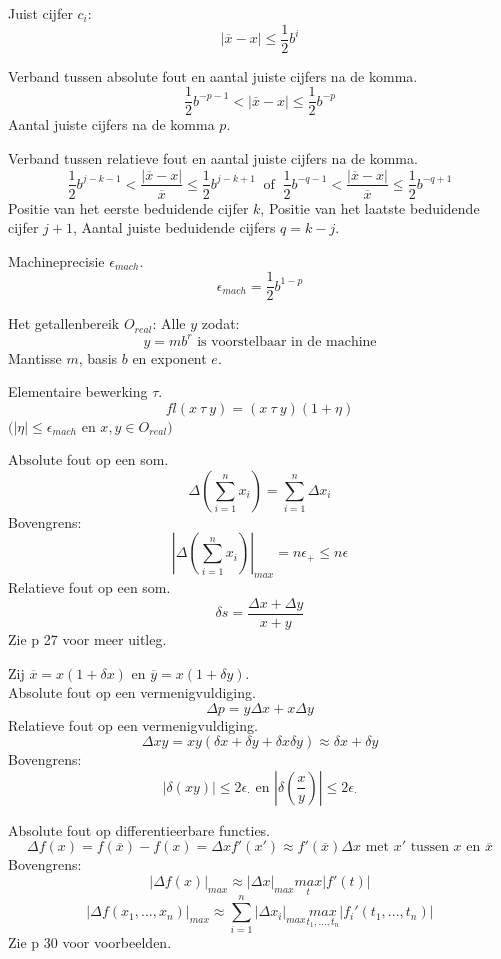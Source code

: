 \documentclass[samenvatting.tex]{subfiles}
\begin{document}
\begin{defi}
Juist cijfer $c_i$:
\[
|\overline{x}-x| \le \frac{1}{2}b^i
\]
\end{defi}
\begin{defi}
Verband tussen absolute fout en aantal juiste cijfers na de komma.
\[
\frac{1}{2}b^{-p-1} < |\overline{x}-x| \le \frac{1}{2}b^{-p}
\]
Aantal juiste cijfers na de komma $p$.
\end{defi}
\begin{defi}
Verband tussen relatieve fout en aantal juiste cijfers na de komma.
\[
\frac{1}{2}b^{j-k-1} < \frac{|\overline{x}-x|}{\overline{x}} \le \frac{1}{2}b^{j-k+1}
\ \text{ of }\ 
\frac{1}{2}b^{-q-1} < \frac{|\overline{x}-x|}{\overline{x}} \le \frac{1}{2}b^{-q+1}
\]
Positie van het eerste beduidende cijfer $k$, Positie van het laatste beduidende cijfer $j+1$, Aantal juiste beduidende cijfers $q=k-j$.
\end{defi}
\begin{defi}
Machineprecisie $\epsilon_{mach}$.
\[
\epsilon_{mach} = \frac{1}{2}b^{1-p}
\]
\end{defi}
\begin{defi}
Het getallenbereik $O_{real}$: Alle $y$ zodat:
\[
y = mb^r \text{ is voorstelbaar in de machine}
\]
Mantisse $m$, basis $b$ en exponent $e$.
\end{defi}
\begin{defi}
Elementaire bewerking $\tau$.
\[
fl(x\ \tau\ y) = (x\ \tau\ y)(1 + \eta)
\]
$(|\eta| \le \epsilon_{mach}$ en $x,y \in O_{real})$
\end{defi}
\begin{defi}
Absolute fout op een som.
\[
\Delta\left(\sum_{i=1}^nx_i\right) = \sum_{i=1}^n\Delta x_i
\]
Bovengrens:
\[
\left|\Delta\left(\sum_{i=1}^nx_i\right)\right|_{max} = n\epsilon_{+} \le n \epsilon
\]
Relatieve fout op een som.
\[
\delta s = \frac{\Delta x + \Delta y}{x+y}
\]
Zie p 27 voor meer uitleg.
\end{defi}
\begin{defi}
Zij $\overline{x} = x(1+\delta x)$ en $\overline{y} = x(1+\delta y)$.\\
Absolute fout op een vermenigvuldiging.
\[
\Delta p = y\Delta x + x\Delta y
\]
Relatieve fout op een vermenigvuldiging. 
\[
\Delta xy = xy(\delta x + \delta y + \delta x \delta y) \approx \delta x + \delta y
\]
Bovengrens:
\[
|\delta(xy)| \le 2\epsilon_{\cdot} \text{ en } \left|\delta\left(\frac{x}{y}\right)\right| \le 2\epsilon_{\cdot}
\]
\end{defi}
\begin{defi}
Absolute fout op differentieerbare functies.
\[
\Delta f(x) = f(\overline{x}) - f(x) = \Delta x f'(x') \approx f'(\overline{x})\Delta x\text{ met } x' \text{ tussen } x \text{ en }\overline{x}
\]
Bovengrens:
\[
|\Delta f(x)|_{max} \approx |\Delta x|_{max} \underset{t}{max}|f'(t)|
\]
\[
|\Delta f(x_1,...,x_n)|_{max} \approx \sum_{i=1}^n|\Delta x_i|_{max} \underset{t_1,...,t_n}{max}|f_i'(t_1,...,t_n)|
\]
Zie p 30 voor voorbeelden.
\end{defi}
\end{document}
